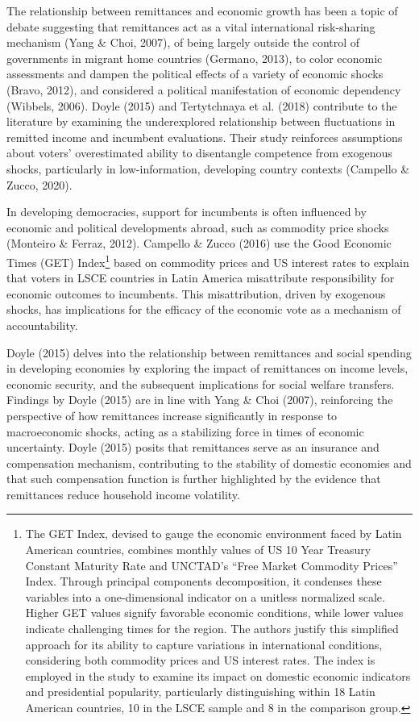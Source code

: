 \documentclass[
]{article}
\begin{document}
The relationship between remittances and economic growth has been a
topic of debate suggesting that remittances act as a vital international
risk-sharing mechanism (Yang \& Choi, 2007), of being largely outside
the control of governments in migrant home countries (Germano, 2013), to
color economic assessments and dampen the political effects of a variety
of economic shocks (Bravo, 2012), and considered a political
manifestation of economic dependency (Wibbels, 2006). Doyle (2015) and
Tertytchnaya et al. (2018) contribute to the literature by examining the
underexplored relationship between fluctuations in remitted income and
incumbent evaluations. Their study reinforces assumptions about voters'
overestimated ability to disentangle competence from exogenous shocks,
particularly in low-information, developing country contexts (Campello
\& Zucco, 2020).

In developing democracies, support for incumbents is often influenced by
economic and political developments abroad, such as commodity price
shocks (Monteiro \& Ferraz, 2012). Campello \& Zucco (2016) use the Good
Economic Times (GET) Index\footnote{The GET Index, devised to gauge the
  economic environment faced by Latin American countries, combines
  monthly values of US 10 Year Treasury Constant Maturity Rate and
  UNCTAD's ``Free Market Commodity Prices'' Index. Through principal
  components decomposition, it condenses these variables into a
  one-dimensional indicator on a unitless normalized scale. Higher GET
  values signify favorable economic conditions, while lower values
  indicate challenging times for the region. The authors justify this
  simplified approach for its ability to capture variations in
  international conditions, considering both commodity prices and US
  interest rates. The index is employed in the study to examine its
  impact on domestic economic indicators and presidential popularity,
  particularly distinguishing within 18 Latin American countries, 10 in
  the LSCE sample and 8 in the comparison group.} based on commodity
prices and US interest rates to explain that voters in LSCE countries in
Latin America misattribute responsibility for economic outcomes to
incumbents. This misattribution, driven by exogenous shocks, has
implications for the efficacy of the economic vote as a mechanism of
accountability.

Doyle (2015) delves into the relationship between remittances and social
spending in developing economies by exploring the impact of remittances
on income levels, economic security, and the subsequent implications for
social welfare transfers. Findings by Doyle (2015) are in line with Yang
\& Choi (2007), reinforcing the perspective of how remittances increase
significantly in response to macroeconomic shocks, acting as a
stabilizing force in times of economic uncertainty. Doyle (2015) posits
that remittances serve as an insurance and compensation mechanism,
contributing to the stability of domestic economies and that such
compensation function is further highlighted by the evidence that
remittances reduce household income volatility.
\end{document}
